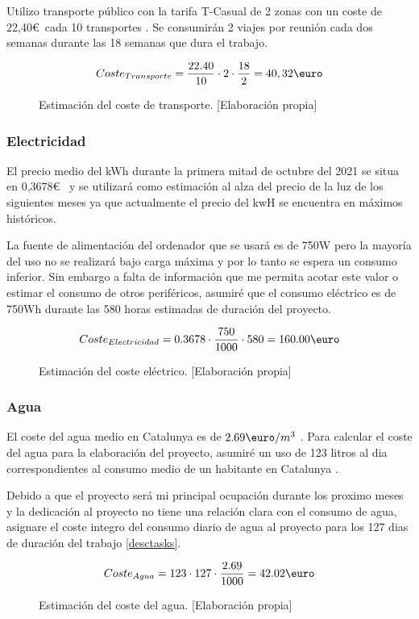 Utilizo transporte público con la tarifa T-Casual de 2 zonas con un coste de 22,40\euro\ cada 10 transportes
\cite{Tcasualcost}. Se consumirán 2 viajes por reunión cada dos semanas durante las 18 semanas que dura el trabajo.
\begin{figure}[H]
    \begin{align*}
        Coste_{Transporte} = \frac{22.40}{10} \cdot 2 \cdot \frac{18}{2} = 40,32\text{\euro}
    \end{align*}
    \caption{Estimación del coste de transporte.  [Elaboración propia]}
\end{figure}

\subsubsection{Electricidad}
El precio medio del kWh durante la primera mitad de octubre del 2021 se situa en 0,3678\euro\ \cite{CosteLuz} y se utilizará como
estimación al alza del precio de la luz de los siguientes meses ya que actualmente el precio del kwH se encuentra
en máximos históricos.

La fuente de alimentación del ordenador que se usará es de 750W pero la mayoría del uso no se realizará bajo carga
máxima y por lo tanto se espera un consumo inferior. Sin embargo a falta de información que me permita acotar
este valor o estimar el consumo de otros periféricos, asumiré que el consumo eléctrico es de 750Wh durante las
580 horas estimadas de duración del proyecto.
\begin{figure}[ht]
    \begin{align*}
        Coste_{Electricidad} = 0.3678 \cdot \frac{750}{1000} \cdot 580 = 160.00\text{\euro}
    \end{align*}
    \caption{Estimación del coste eléctrico.  [Elaboración propia]}
\end{figure}

\subsubsection{Agua}
El coste del agua medio en Catalunya es de \( 2.69\text{\euro}/m^{3} \) \cite{CosteAgua}. Para calcular el coste del agua para
la elaboración del proyecto, asumiré un uso de 123 litros al dia correspondientes al consumo medio de un habitante
en Catalunya \cite{ConsumoAgua}.

Debido a que el proyecto será mi principal ocupación durante los proximo meses y 
la dedicación al proyecto no tiene una relación clara con el consumo de agua, asignare el coste integro del consumo
diario de agua al proyecto para los 127 dias de duración del trabajo \ref{desctasks}.
\begin{figure}[ht]
    \begin{align*}
        Coste_{Agua} = 123 \cdot 127 \cdot \frac{2.69}{1000} = 42.02\text{\euro}
    \end{align*}
    \caption{Estimación del coste del agua.  [Elaboración propia]}
\end{figure}


